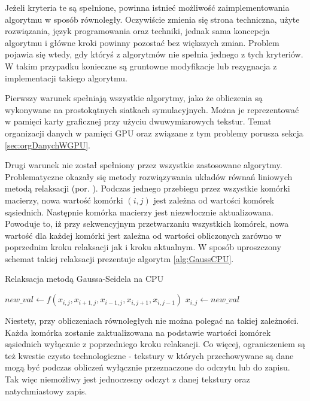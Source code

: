 Jeżeli kryteria te są spełnione, powinna istnieć możliwość zaimplementowania
algorytmu w sposób równoległy. Oczywiście zmienia się strona techniczna, użyte
rozwiązania, język programowania oraz techniki, jednak sama koncepcja
algorytmu i główne kroki powinny pozostać bez większych zmian. Problem pojawia
się wtedy, gdy któryś z algorytmów nie spełnia jednego z tych kryteriów. W
takim przypadku konieczne są gruntowne modyfikacje lub rezygnacja z
implementacji takiego algorytmu.

Pierwszy warunek spełniają wszystkie algorytmy, jako że obliczenia są wykonywane
na prostokątnych siatkach symulacyjnych. Można je reprezentować w pamięci karty
graficznej przy użyciu dwuwymiarowych tekstur. Temat organizacji danych w
pamięci GPU oraz związane z tym problemy porusza sekcja \ref{sec:orgDanychWGPU}.

Drugi warunek nie został spełniony przez wszystkie zastosowane algorytmy.
Problematyczne okazały się metody rozwiązywania układów równań liniowych metodą
relaksacji  (por. \cite{GaussSeidel}). Podczas jednego
przebiegu przez wszystkie komórki macierzy, nowa wartość komórki $(i, j)$ jest
zależna od wartości komórek sąsiednich. Następnie komórka macierzy jest
niezwłocznie aktualizowana. Powoduje to, iż przy sekwencyjnym przetwarzaniu
wszystkich komórek, nowa wartość dla każdej komórki jest zależna od wartości
obliczonych zarówno w poprzednim kroku relaksacji jak i kroku aktualnym. W
sposób uproszczony schemat takiej relaksacji prezentuje algorytm
\ref{alg:GaussCPU}.

\begin{algorithm}[!h]
  \caption{Relaksacja metodą Gaussa-Seidela na CPU}
  \label{alg:GaussCPU}
\begin{algorithmic}
    \State $new\_val\gets f(x_{i,j}, x_{i+1,j}, x_{i-1,j}, x_{i,j+1}, x_{i,j-1})$
    \State $x_{i,j}\gets new\_val$
  \EndFor
\EndFor
\end{algorithmic}
\end{algorithm}

Niestety, przy obliczeniach równoległych nie można polegać na takiej zależności.
Każda komórka zostanie zaktualizowana na podstawie wartości komórek sąsiednich
wyłącznie z poprzedniego kroku relaksacji. Co więcej, ograniczeniem są też
kwestie czysto technologiczne - tekstury w których przechowywane są dane mogą
być podczas obliczeń wyłącznie przeznaczone do odczytu lub do zapisu. Tak więc
niemożliwy jest jednoczesny odczyt z danej tekstury oraz natychmiastowy zapis.

